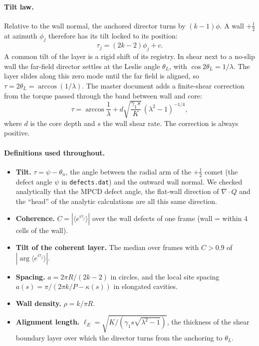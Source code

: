 \documentclass[11pt,a4paper]{article}
\newcommand{\half}{\tfrac12}
\begin{document}
\paragraph{Tilt law.} Relative to the wall normal, the anchored director turns by $(k-1)\phi$. A wall $+\half$ at azimuth $\phi_j$ therefore has its tilt locked to its position:
\begin{equation}
\tau_j=(2k-2)\phi_j+c .\label{eq:lock}
\end{equation}
A common tilt of the layer is a rigid shift of its registry. In shear next to a no-slip wall the far-field director settles at the Leslie angle $\theta_L$, with $\cos2\theta_L=1/\lambda$. The layer slides along this zero mode until the far field is aligned, so $\tau=2\theta_L=\arccos(1/\lambda)$. The master document adds a finite-shear correction from the torque passed through the band between wall and core:
\begin{equation}
\tau=\arccos\frac1\lambda+d\sqrt{\frac{\gamma_1 s}{K}}\,(\lambda^2-1)^{-1/4},\label{eq:corr}
\end{equation}
where $d$ is the core depth and $s$ the wall shear rate. The correction is always positive.

\paragraph{Definitions used throughout.}
\begin{itemize}
\item \textbf{Tilt.} $\tau=\psi-\theta_n$, the angle between the radial arm of the $+\half$ comet (the defect angle $\psi$ in \texttt{defects.dat}) and the outward wall normal. We checked analytically that the MPCD defect angle, the flat-wall direction of $\nabla\!\cdot\!Q$ and the ``head'' of the analytic calculations are all this same direction.
\item \textbf{Coherence.} $C=|\langle e^{i\tau_j}\rangle|$ over the wall defects of one frame (wall = within 4 cells of the wall).
\item \textbf{Tilt of the coherent layer.} The median over frames with $C>0.9$ of $|\arg\langle e^{i\tau_j}\rangle|$.
\item \textbf{Spacing.} $a=2\pi R/(2k-2)$ in circles, and the local site spacing $a(s)=\pi/(2\pi k/P-\kappa(s))$ in elongated cavities.
\item \textbf{Wall density.} $\rho=k/\pi R$.
\item \textbf{Alignment length.} $\ell_E=\sqrt{K/(\gamma_1 s\sqrt{\lambda^2-1})}$, the thickness of the shear boundary layer over which the director turns from the anchoring to $\theta_L$.
\end{itemize}
\end{document}
